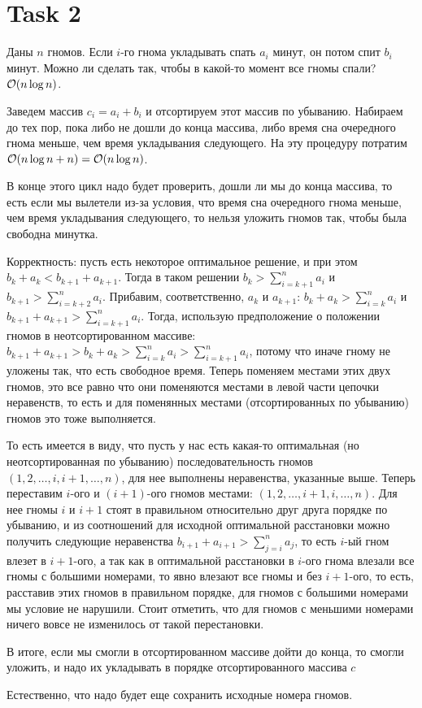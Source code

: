 \section{Task 2}
\begin{task}
    Даны $n$ гномов. Если $i$-го гнома укладывать спать $a_i$ минут, он потом спит $b_i$ минут. Можно ли сделать так, чтобы в какой-то момент все гномы спали? $\mathcal{O}(n\log n)$.
\end{task}

\begin{solution}
    Заведем массив $c_i = a_i + b_i$ и отсортируем этот массив по убыванию. Набираем до тех пор, пока либо не дошли до конца массива, либо время сна очередного гнома меньше, чем время укладывания следующего. На эту процедуру потратим $\mathcal{O}(n\log n + n) = \mathcal{O}(n\log n)$.
    \begin{upd}
        В конце этого цикл надо будет проверить, дошли ли мы до конца массива, то есть если мы вылетели из-за условия, что время сна очередного гнома меньше, чем время укладывания следующего, то нельзя уложить гномов так, чтобы была свободна минутка.
    \end{upd}

    Корректность: пусть есть некоторое оптимальное решение, и при этом $b_k + a_k < b_{k+1} + a_{k+1}$. Тогда в таком решении $b_k > \sum\limits_{i=k+1}^n a_i$ и $b_{k+1} > \sum\limits_{i=k+2}^n a_i$. Прибавим, соответственно, $a_k$ и $a_{k+1}$: $b_k + a_k > \sum\limits_{i=k}^n a_i$ и $b_{k+1} + a_{k+1} > \sum\limits_{i=k+1}^n a_i$. Тогда, использую предположение о положении гномов в неотсортированном массиве: $b_{k+1} + a_{k+1} > b_k + a_k > \sum\limits_{i=k}^n a_i > \sum\limits_{i=k+1}^n a_i$, потому что иначе гному не уложены так, что есть свободное время. Теперь поменяем местами этих двух гномов, это все равно что они поменяются местами в левой части цепочки неравенств, то есть и для поменянных местами (отсортированных по убыванию) гномов это тоже выполняется.
    \begin{upd}
        То есть имеется в виду, что пусть у нас есть какая-то оптимальная (но неотсортированная по убыванию) последовательность гномов $(1,2,\ldots,i,i+1,\ldots,n)$, для нее выполнены неравенства, указанные выше. Теперь переставим $i$-ого и $(i+1)$-ого гномов местами: $(1,2,\ldots,i+1,i,\ldots,n)$. Для нее гномы $i$ и $i+1$ стоят в правильном относительно друг друга порядке по убыванию, и из соотношений для исходной оптимальной расстановки можно получить следующие неравенства $b_{i+1}+a_{i+1} > \sum\limits_{j=i}^{n}a_j$, то есть $i$-ый гном влезет в $i+1$-ого, а так как в оптимальной расстановки в $i$-ого гнома влезали все гномы с большими номерами, то явно влезают все гномы и без $i+1$-ого, то есть, расставив этих гномов в правильном порядке, для гномов с большими номерами мы условие не нарушили. Стоит отметить, что для гномов с меньшими номерами ничего вовсе не изменилось от такой перестановки.
    \end{upd}

    В итоге, если мы смогли в отсортированном массиве дойти до конца, то смогли уложить, и надо их укладывать в порядке отсортированного массива $c$
    \begin{remark}
        Естественно, что надо будет еще сохранить исходные номера гномов.
    \end{remark}
\end{solution}